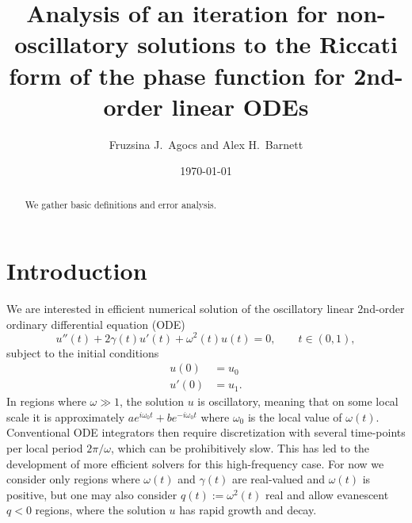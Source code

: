 \documentclass[10pt]{article}
\newcommand{\be}{\begin{equation}}
\newcommand{\ee}{\end{equation}}
\newcommand{\ba}{\begin{align}}
\newcommand{\ea}{\end{align}}
\newcommand{\om}{\omega}
\newcommand{\g}{\gamma}
\begin{document}
\title{Analysis of an iteration for non-oscillatory solutions to the Riccati form of the phase function for 2nd-order linear ODEs}

\author{Fruzsina J.\ Agocs and Alex H.\ Barnett}
\date{\today}
\maketitle

\begin{abstract}
We gather basic definitions and error analysis.
\end{abstract}

\section{Introduction}

We are interested in efficient numerical solution of
the oscillatory linear 2nd-order ordinary differential equation (ODE)
\be
u''(t) + 2\g(t) u'(t) + \om^2(t)u(t) = 0, \qquad t \in (0,1),
\label{ode}
\ee
subject to the initial conditions
\begin{align} %
    u(0) &= u_0 \label{ic0} \\
    u'(0) &= u_1. \label{ic1}
\end{align}
In regions where $\om \gg 1$, the solution $u$ is oscillatory, meaning that on some local
scale it is approximately $a e^{i\om_0t} + b e^{-i\om_0t}$ where $\om_0$ is the local value of $\om(t)$.
Conventional ODE integrators then require discretization with several
time-points per local period $2\pi/\om$, which can be prohibitively slow.
This has led to the development of more efficient solvers for this
high-frequency case.
For now we consider only regions where $\om(t)$ and $\g(t)$ are real-valued and $\om(t)$ is positive, but 
one may also consider $q(t):=\om^2(t)$ real and allow evanescent
$q<0$ regions, where the solution $u$ has rapid growth and decay.
\end{document}

